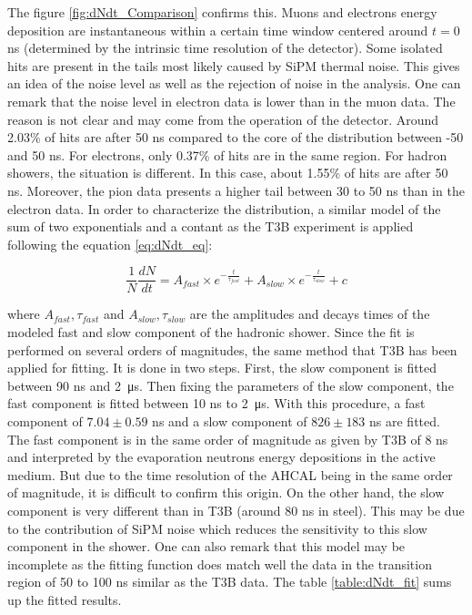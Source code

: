 The figure \ref{fig:dNdt_Comparison} confirms this. Muons and electrons energy deposition are instantaneous within a certain time window centered around $t=0$ ns (determined by the intrinsic time resolution of the detector). Some isolated hits are present in the tails most likely caused by SiPM thermal noise. This gives an idea of the noise level as well as the rejection of noise in the analysis. One can remark that the noise level in electron data is lower than in the muon data. The reason is not clear and may come from the operation of the detector. Around 2.03\% of hits are after 50 ns compared to the core of the distribution between -50 and 50 ns. For electrons, only 0.37\% of hits are in the same region.
For hadron showers, the situation is different. In this case, about 1.55\% of hits are after 50 ns. Moreover, the pion data presents a higher tail between 30 to 50 ns than in the electron data. In order to characterize the distribution, a similar model of the sum of two exponentials and a contant as the T3B experiment \cite{Simon2013} is applied following the equation \ref{eq:dNdt_eq}:

\begin{equation} \label{eq:dNdt_eq}
	\frac{1}{N}\frac{dN}{dt} = A_{fast} \times e^{-\frac{t}{\tau_{fast}}} + A_{slow} \times e^{-\frac{t}{\tau_{slow}}} + c
\end{equation}

where $A_{fast}, \tau_{fast}$ and $A_{slow}, \tau_{slow}$ are the amplitudes and decays times of the modeled fast and slow component of the hadronic shower. Since the fit is performed on several orders of magnitudes, the same method that T3B has been applied for fitting. It is done in two steps. First, the slow component is fitted between 90 ns and \SI{2}{\micro\second}. Then fixing the parameters of the slow component, the fast component is fitted between 10 ns to \SI{2}{\micro\second}.
With this procedure, a fast component of $7.04 \pm 0.59$ ns and a slow component of $826 \pm 183$ ns are fitted. The fast component is in the same order of magnitude as given by T3B of 8 ns and interpreted by the evaporation neutrons energy depositions in the active medium. But due to the time resolution of the AHCAL being in the same order of magnitude, it is difficult to confirm this origin. On the other hand, the slow component is very different than in T3B (around 80 ns in steel). This may be due to the contribution of SiPM noise which reduces the sensitivity to this slow component in the shower. One can also remark that this model may be incomplete as the fitting function does match well the data in the transition region of 50 to 100 ns similar as the T3B data. The table \ref{table:dNdt_fit} sums up the fitted results.

